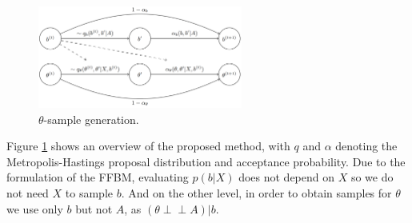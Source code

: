 \begin{figure}[!ht]
	\centering
%		
%		
%		
%		
	\includegraphics[width=0.6\textwidth]{img/sampling-sequence}
	\caption{$\theta$-sample generation.}
	\label{fig:samp-sequence}
\end{figure}
 
Figure \ref{fig:samp-sequence} shows an overview of the proposed method, with $q$ and $\alpha$ denoting the Metropolis-Hastings proposal distribution and acceptance probability.
Due to the formulation of the FFBM, evaluating $p(b| X)$ does not depend on $X$ so
we do not need $X$ to sample $b$.
And on the other level, in order to obtain 
samples for $\theta$
we use only $b$ but not $A$, as $(\theta \perp \!\!\! \perp A )| b$. 
